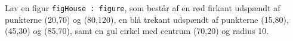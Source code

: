 Lav en figur \texttt{figHouse : figure}, som består af en rød
  firkant udspændt af punkterne (20,70) og (80,120), en blå trekant udspændt af
  punkterne (15,80), (45,30) og (85,70), samt en gul cirkel med centrum (70,20) og radius
  10.